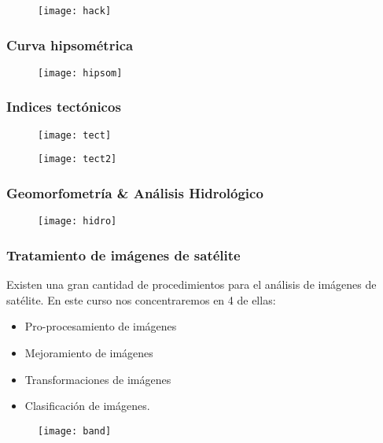 \documentclass[14pt]{beamer}
\begin{document}
\begin{frame}
  \begin{figure}
    \centering
    \texttt{[image: hack]}
  \end{figure}
\tiny{}
\end{frame}
\begin{frame}
\frametitle{Curva hipsométrica}
  \begin{figure}
    \centering
    \texttt{[image: hipsom]}
  \end{figure}
\tiny{}
\end{frame}
\begin{frame}
\frametitle{Indices tectónicos}
  \begin{figure}
    \centering
    \texttt{[image: tect]}
  \end{figure}
\tiny{}
\end{frame}
\begin{frame}
  \begin{figure}
    \centering
    \texttt{[image: tect2]}
  \end{figure}
\tiny{}
\end{frame}
\begin{frame}
\frametitle{Geomorfometría \& Análisis Hidrológico}
  \begin{figure}
    \centering
    \texttt{[image: hidro]}
  \end{figure}
\end{frame}
\begin{frame}
\frametitle{Tratamiento de imágenes de satélite}
\scriptsize{Existen una gran cantidad de procedimientos para el análisis de imágenes de satélite. En este curso nos concentraremos en 4 de ellas:}
\begin{itemize}
\item Pro-procesamiento de imágenes
\item Mejoramiento de imágenes
\item Transformaciones de imágenes
\item Clasificación de imágenes.
\end{itemize}
  \begin{figure}
    \centering
    \texttt{[image: band]}
  \end{figure}
\end{frame}
\end{document}
